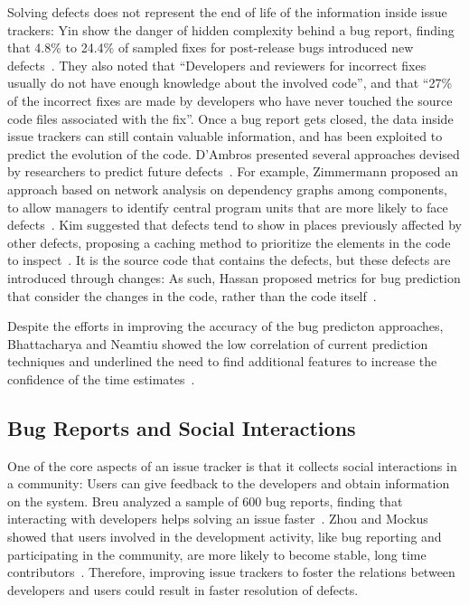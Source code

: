 Solving defects does not represent the end of life of the information inside issue trackers: Yin \etal show the danger of hidden complexity behind a bug report, finding that 4.8\% to 24.4\% of sampled fixes for post-release bugs introduced new defects~\cite{Yin2011a}. They also noted that ``Developers and reviewers for incorrect fixes usually do not have enough knowledge about the involved code'', and that ``27\% of the incorrect fixes are made by developers who have never touched the source code files associated with the fix''. Once a bug report gets closed, the data inside issue trackers can still contain valuable information, and has been exploited to predict the evolution of the code. D'Ambros \etal presented several approaches devised by researchers to predict future defects~\cite{DAmb2012a}. For example,  Zimmermann \etal proposed an approach based on network analysis on dependency graphs among components, to allow managers to identify central program units that are more likely to face defects~\cite{Zimm2008a}. Kim \etal suggested that defects tend to show in places previously affected by other defects, proposing a caching method to prioritize the elements in the code to inspect~\cite{Kim2007a}. It is the source code that contains the defects, but these defects are introduced through changes: As such, Hassan \etal proposed metrics for bug prediction that consider the changes in the code, rather than the code itself~\cite{Hass2009a}.


Despite the efforts in improving the accuracy of the bug predicton approaches, Bhattacharya and Neamtiu showed the low correlation of current prediction techniques and underlined the need to find additional features to increase the confidence of the time estimates~\cite{Bhat2011}.


\subsection{Bug Reports and Social Interactions}

One of the core aspects of an issue tracker is that it collects social interactions in a community: Users can give feedback to the developers and obtain information on the system. Breu \etal analyzed a sample of 600 bug reports, finding that interacting with developers helps solving an issue faster~\cite{Breu2010}. Zhou and Mockus showed that users involved in the development activity, like bug reporting and participating in the community, are more likely to become stable, long time contributors~\cite{Zhou2015}. Therefore, improving issue trackers to foster the relations between developers and users could result in faster resolution of defects.


